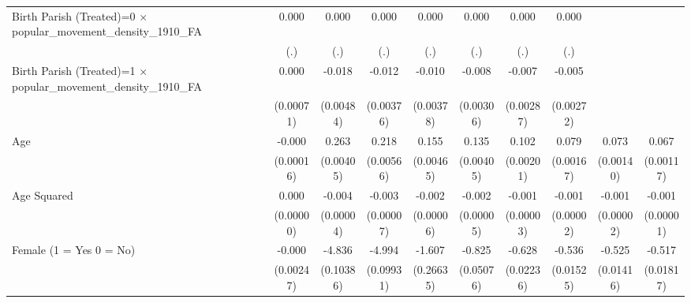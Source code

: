 {\begin{tabular}{l*{9}{c}}
Birth Parish (Treated)=0 $\times$ popular\_movement\_density\_1910\_FA&       0.000         &       0.000         &       0.000         &       0.000         &       0.000         &       0.000         &       0.000         &                     &                     \\
                    &         (.)         &         (.)         &         (.)         &         (.)         &         (.)         &         (.)         &         (.)         &                     &                     \\
Birth Parish (Treated)=1 $\times$ popular\_movement\_density\_1910\_FA&       0.000         &      -0.018\sym{***}&      -0.012\sym{**} &      -0.010\sym{*}  &      -0.008\sym{**} &      -0.007\sym{*}  &      -0.005         &                     &                     \\
                    &   (0.00071)         &   (0.00484)         &   (0.00376)         &   (0.00378)         &   (0.00306)         &   (0.00287)         &   (0.00272)         &                     &                     \\
Age                 &      -0.000         &       0.263\sym{***}&       0.218\sym{***}&       0.155\sym{***}&       0.135\sym{***}&       0.102\sym{***}&       0.079\sym{***}&       0.073\sym{***}&       0.067\sym{***}\\
                    &   (0.00016)         &   (0.00405)         &   (0.00566)         &   (0.00465)         &   (0.00405)         &   (0.00201)         &   (0.00167)         &   (0.00140)         &   (0.00117)         \\
Age Squared         &       0.000         &      -0.004\sym{***}&      -0.003\sym{***}&      -0.002\sym{***}&      -0.002\sym{***}&      -0.001\sym{***}&      -0.001\sym{***}&      -0.001\sym{***}&      -0.001\sym{***}\\
                    &   (0.00000)         &   (0.00004)         &   (0.00007)         &   (0.00006)         &   (0.00005)         &   (0.00003)         &   (0.00002)         &   (0.00002)         &   (0.00001)         \\
Female (1 = Yes 0 = No)&      -0.000         &      -4.836\sym{***}&      -4.994\sym{***}&      -1.607\sym{***}&      -0.825\sym{***}&      -0.628\sym{***}&      -0.536\sym{***}&      -0.525\sym{***}&      -0.517\sym{***}\\
                    &   (0.00247)         &   (0.10386)         &   (0.09931)         &   (0.26635)         &   (0.05076)         &   (0.02236)         &   (0.01525)         &   (0.01416)         &   (0.01817)         \\

\end{tabular}}
